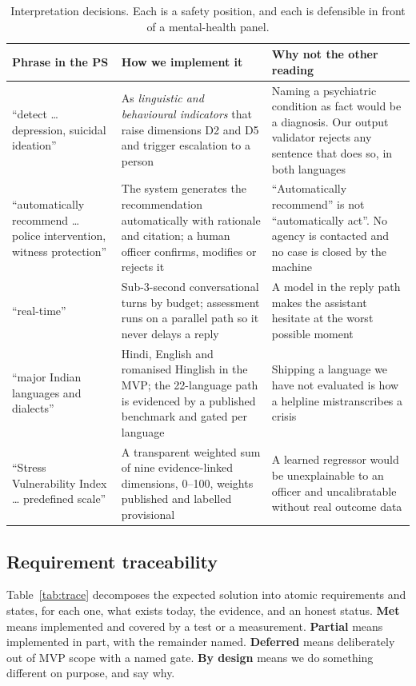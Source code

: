\documentclass[11pt,a4paper]{article}
\newcommand{\yes}{\textcolor{sahaygreen}{\textbf{Met}}}
\newcommand{\partly}{\textcolor{sahayorange}{\textbf{Partial}}}
\newcommand{\defer}{\textcolor{sahaygray}{\textbf{Deferred}}}
\newcommand{\bydesign}{\textcolor{sahaypurple}{\textbf{By design}}}
\begin{document}
\begin{table}[!htbp]
\centering\small
\caption{Interpretation decisions. Each is a safety position, and each is defensible in front of a
mental-health panel.}
\label{tab:interp}
\begin{tabularx}{\linewidth}{@{}>{\raggedright\arraybackslash}p{3.6cm}>{\raggedright\arraybackslash}p{5.4cm}X@{}}
\toprule
Phrase in the PS & How we implement it & Why not the other reading \\
\midrule
``detect \ldots{} depression, suicidal ideation'' & As \emph{linguistic and behavioural indicators}
that raise dimensions D2 and D5 and trigger escalation to a person & Naming a psychiatric condition
as fact would be a diagnosis. Our output validator rejects any sentence that does so, in both
languages \\
``automatically recommend \ldots{} police intervention, witness protection'' & The system generates
the recommendation automatically with rationale and citation; a human officer confirms, modifies or
rejects it & ``Automatically recommend'' is not ``automatically act''. No agency is contacted and no
case is closed by the machine \\
``real-time'' & Sub-3-second conversational turns by budget; assessment runs on a parallel path so
it never delays a reply & A model in the reply path makes the assistant hesitate at the worst
possible moment \\
``major Indian languages and dialects'' & Hindi, English and romanised Hinglish in the MVP; the
22-language path is evidenced by a published benchmark and gated per language & Shipping a language
we have not evaluated is how a helpline mistranscribes a crisis \\
``Stress Vulnerability Index \ldots{} predefined scale'' & A transparent weighted sum of nine
evidence-linked dimensions, 0--100, weights published and labelled provisional & A learned regressor
would be unexplainable to an officer and uncalibratable without real outcome data \\
\bottomrule
\end{tabularx}
\end{table}
\subsection{Requirement traceability}
\label{sec:trace}

Table~\ref{tab:trace} decomposes the expected solution into atomic requirements and states, for each
one, what exists today, the evidence, and an honest status. \yes{} means implemented and covered by a
test or a measurement. \partly{} means implemented in part, with the remainder named.
\defer{} means deliberately out of MVP scope with a named gate. \bydesign{} means we do something
different on purpose, and say why.
\end{document}
